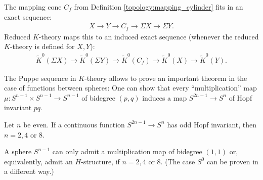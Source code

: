 {    \begin{property}
        The mapping cone $C_f$ from Definition \ref{topology:mapping_cylinder} fits in an exact sequence:
        \begin{gather}
            X\longrightarrow Y\longrightarrow C_f\longrightarrow\Sigma X\longrightarrow\Sigma Y.
        \end{gather}
        Reduced $K$-theory maps this to an induced exact sequence (whenever the reduced $K$-theory is defined for $X,Y$):
        \begin{gather}
            \widetilde{K}^0(\Sigma X)\longrightarrow\widetilde{K}^0(\Sigma Y)\longrightarrow \widetilde{K}^0(C_f)\longrightarrow\widetilde{K}^0(X)\longrightarrow\widetilde{K}^0(Y).
        \end{gather}
    \end{property}
    The Puppe sequence in $K$-theory allows to prove an important theorem in the case of functions between spheres:
     One can show that every ``multiplication'' map $\mu:S^{n-1}\times S^{n-1}\rightarrow S^{n-1}$ of bidegree $(p,q)$ induces a map $S^{2n-1}\rightarrow S^n$ of Hopf invariant $pq$.

     \begin{theorem}
         Let $n$ be even. If a continuous function $S^{2n-1}\rightarrow S^n$ has odd Hopf invariant, then $n=2,4$ or 8.
     \end{theorem}
     \begin{result}
         A sphere $S^{n-1}$ can only admit a multiplication map of bidegree $(1,1)$ or, equivalently, admit an $H$-structure, if $n=2,4$ or 8. (The case $S^0$ can be proven in a different way.)
     \end{result}

}
